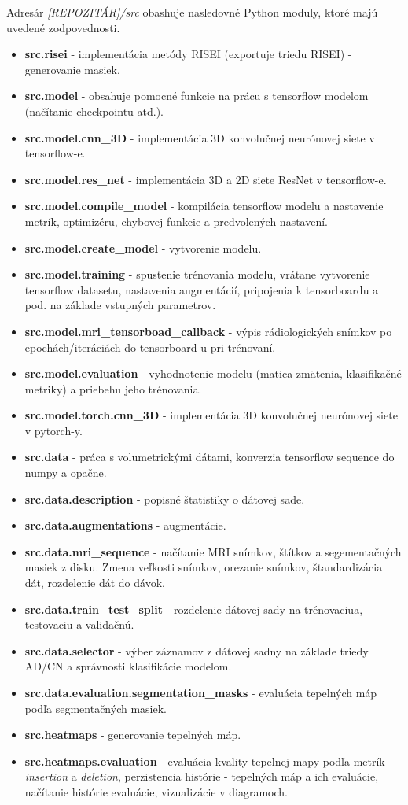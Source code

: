 Adresár \textit{[REPOZITÁR]/src} obashuje nasledovné Python moduly, ktoré majú uvedené zodpovednosti.

\begin{itemize}
    \item \textbf{src.risei} - implementácia metódy RISEI (exportuje triedu RISEI) - generovanie masiek.
    \item \textbf{src.model} - obsahuje pomocné funkcie na prácu s tensorflow modelom (načítanie checkpointu atď.). 
    \item \textbf{src.model.cnn\_3D} - implementácia 3D konvolučnej neurónovej siete v tensorflow-e.
    \item \textbf{src.model.res\_net} - implementácia 3D a 2D siete ResNet v tensorflow-e.
    \item \textbf{src.model.compile\_model} - kompilácia tensorflow modelu a nastavenie metrík, optimizéru, chybovej funkcie a predvolených nastavení.
    \item \textbf{src.model.create\_model} - vytvorenie modelu.
    \item \textbf{src.model.training} - spustenie trénovania modelu, vrátane vytvorenie tensorflow datasetu, nastavenia augmentácií, pripojenia k tensorboardu a pod. na základe vstupných parametrov.
    \item \textbf{src.model.mri\_tensorboad\_callback} - výpis rádiologických snímkov po epochách/iteráciách do tensorboard-u pri trénovaní.
    \item \textbf{src.model.evaluation} - vyhodnotenie modelu (matica zmätenia, klasifikačné metriky) a priebehu jeho trénovania.
    \item \textbf{src.model.torch.cnn\_3D} - implementácia 3D konvolučnej neurónovej siete v pytorch-y.
    \item \textbf{src.data} - práca s volumetrickými dátami, konverzia tensorflow sequence do numpy a opačne.
    \item \textbf{src.data.description} - popisné štatistiky o dátovej sade.
    \item \textbf{src.data.augmentations} - augmentácie.
    \item \textbf{src.data.mri\_sequence} - načítanie MRI snímkov, štítkov a segementačných masiek z disku. Zmena veľkosti snímkov, orezanie snímkov, štandardizácia dát, rozdelenie dát do dávok.
    \item \textbf{src.data.train\_test\_split} - rozdelenie dátovej sady na trénovaciua, testovaciu a validačnú.
    \item \textbf{src.data.selector} - výber záznamov z dátovej sadny na základe triedy AD/CN a správnosti klasifikácie modelom.
    \item \textbf{src.data.evaluation.segmentation\_masks} - evaluácia tepelných máp podľa segmentačných masiek.
    \item \textbf{src.heatmaps} - generovanie tepelných máp.
    \item \textbf{src.heatmaps.evaluation} - evaluácia kvality tepelnej mapy podľa metrík \textit{insertion} a \textit{deletion}, perzistencia histórie - tepelných máp a ich evaluácie, načítanie histórie evaluácie, vizualizácie v diagramoch. 
\end{itemize}

